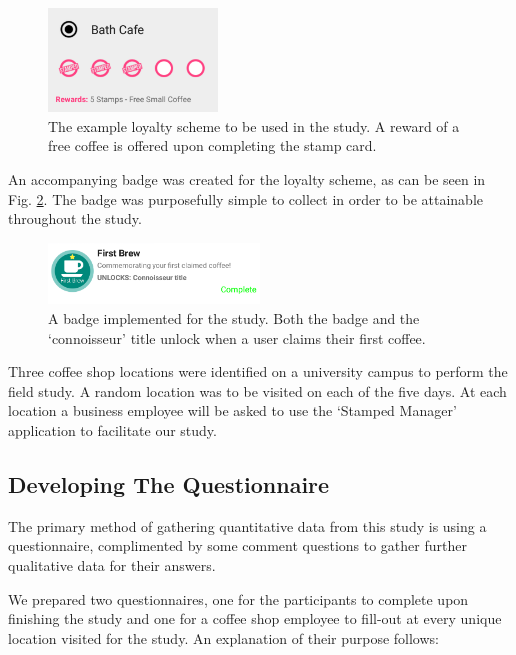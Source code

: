 \begin{figure}[H]
 \centering
  \includegraphics[width=0.40\textwidth]{img/bathcafe.png}
     \caption{The example loyalty scheme to be used in the study. A reward of a free coffee is offered upon completing the stamp card.}
     \label{fig:bathcafe}
\end{figure}

An accompanying badge was created for the loyalty scheme, as can be seen in Fig. \ref{fig:badge2}. The badge was purposefully simple to collect in order to be attainable throughout the study.

\begin{figure}[H]
 \centering
  \includegraphics[width=0.50\textwidth]{img/badge2.png}
     \caption{A badge implemented for the study. Both the badge and the `connoisseur' title unlock when a user claims their first coffee.}
     \label{fig:badge2}
\end{figure}
 
Three coffee shop locations were identified on a university campus to perform the field study. A random location was to be visited on each of the five days. At each location a business employee will be asked to use the `Stamped Manager' application to facilitate our study.
 
\subsection{Developing The Questionnaire}
The primary method of gathering quantitative data from this study is using a questionnaire, complimented by some comment questions to gather further qualitative data for their answers.

We prepared two questionnaires, one for the participants to complete upon finishing the study and one for a coffee shop employee to fill-out at every unique location visited for the study. An explanation of their purpose follows:

